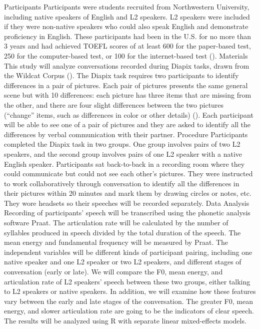 \documentclass[
  man,
  floatsintext,
  longtable,
  nolmodern,
  notxfonts,
  notimes,
  colorlinks=true,linkcolor=blue,citecolor=blue,urlcolor=blue]{apa7}
\begin{document}
Participants Participants were students recruited from Northwestern
University, including native speakers of English and L2 speakers. L2
speakers were included if they were non-native speakers who could also
speak English and demonstrate proficiency in English. These participants
had been in the U.S. for no more than 3 years and had achieved TOEFL
scores of at least 600 for the paper-based test, 250 for the
computer-based test, or 100 for the internet-based test
().
Materials This study will analyze conversations recorded during Diapix
tasks, drawn from the Wildcat Corpus
(). The
Diapix task requires two participants to identify differences in a pair
of pictures. Each pair of pictures presents the same general scene but
with 10 differences: each picture has three items that are missing from
the other, and there are four slight differences between the two
pictures (``change'' items, such as differences in color or other
details) (). Each participant will be able to see one of a pair of pictures
and they are asked to identify all the differences by verbal
communication with their partner. Procedure Participants completed the
Diapix task in two groups. One group involves pairs of two L2 speakers,
and the second group involves pairs of one L2 speaker with a native
English speaker. Participants sat back-to-back in a recording room where
they could communicate but could not see each other's pictures. They
were instructed to work collaboratively through conversation to identify
all the differences in their pictures within 20 minutes and mark them by
drawing circles or notes, etc. They wore headsets so their speeches will
be recorded separately. Data Analysis Recording of participants' speech
will be transcribed using the phonetic analysis software Praat. The
articulation rate will be calculated by the number of syllables produced
in speech divided by the total duration of the speech. The mean energy
and fundamental frequency will be measured by Praat. The independent
variables will be different kinds of participant pairing, including one
native speaker and one L2 speaker or two L2 speakers, and different
stages of conversation (early or late). We will compare the F0, mean
energy, and articulation rate of L2 speakers' speech between these two
groups, either talking to L2 speakers or native speakers. In addition,
we will examine how these features vary between the early and late
stages of the conversation. The greater F0, mean energy, and slower
articulation rate are going to be the indicators of clear speech. The
results will be analyzed using R with separate linear mixed-effects
models.
\end{document}
